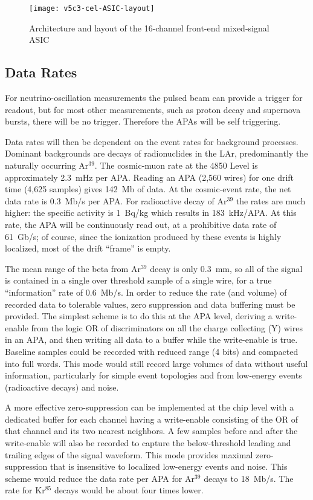 \begin{figure}[htbp]
\centering
\texttt{[image: v5c3-cel-ASIC-layout]}
\caption{Architecture and layout of the 16-channel front-end mixed-signal ASIC}
\label{fig:ce-elec-asic-layout}
\end{figure}

\subsection{Data Rates}

For neutrino-oscillation measurements the pulsed beam can provide a
trigger for readout, but for most other measurements, such as proton decay
and supernova bursts, there will be no trigger.  Therefore the APAs will be
self triggering.  

Data rates will then
be dependent on the event rates for background processes.  Dominant
backgrounds are decays of radionuclides in the LAr,
predominantly the naturally occurring Ar$^{39}$.  The cosmic-muon rate at the 4850 Level is approximately 2.3~mHz per APA.  Reading an APA (2,560 wires) for
one drift time (4,625 samples) gives 142~Mb of data. At the cosmic-event rate,
the net data rate is 0.3~Mb/s per APA.  For radioactive decay of Ar$^{39}$
the rates are much higher: the specific activity is 1~Bq/kg which results in 183~kHz/APA.
At this rate, the APA will be continuously read out, at a prohibitive data
rate of 61~Gb/s; of course, since the ionization produced by these events is highly localized,
most of the drift ``frame'' is empty.

The mean range of the beta from Ar$^{39}$ decay is only 0.3~mm, so all
of the signal is contained in a single over threshold sample of a single wire, for a true ``information''
rate of 0.6~Mb/s. In order to
reduce the rate (and volume) of recorded data to tolerable values, 
zero suppression and data buffering must be
provided.  The simplest scheme is to do this at the APA level, deriving
a write-enable from the logic OR of discriminators on all the charge
collecting (Y) wires in an APA, and then writing all data to a buffer
while the write-enable is true.  Baseline samples could be recorded
with reduced range (4 bits) and compacted into full words.  This mode
would still record large volumes of data without useful
information, particularly for simple event topologies and from low-energy 
events (radioactive decays) and noise. 

A more effective
zero-suppression can be implemented at the chip level with a dedicated buffer for each
channel having a write-enable consisting of the OR of  that channel and
its two nearest neighbors.  A few samples before and after the write-enable 
will also be recorded to capture the below-threshold leading
and trailing edges of the signal waveform.  This mode provides maximal
zero-suppression that is insensitive to localized low-energy events
and noise. This scheme would reduce the data rate per APA for Ar$^{39}$ decays to
18~Mb/s. The rate for Kr$^{85}$ decays would be about four times lower.

